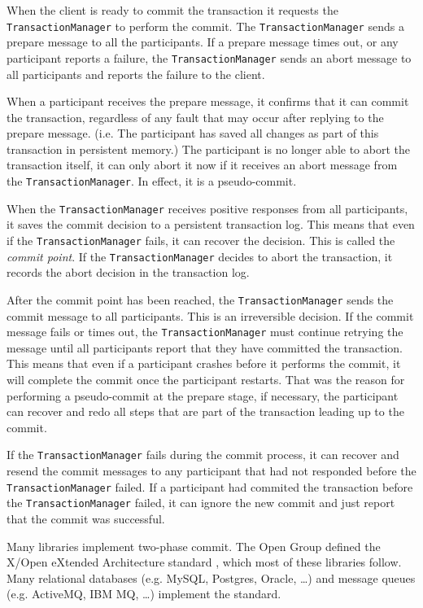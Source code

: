 When the client is ready to commit the transaction it requests the \texttt{TransactionManager} to perform the commit.
The \texttt{TransactionManager} sends a prepare message to all the participants.
If a prepare message times out, or any participant reports a failure,
the \texttt{TransactionManager} sends an abort message to all participants and reports the failure to the client.

When a participant receives the prepare message, it confirms that it can commit the transaction,
regardless of any fault that may occur after replying to the prepare message.
(i.e. The participant has saved all changes as part of this transaction in persistent memory.)
The participant is no longer able to abort the transaction itself,
it can only abort it now if it receives an abort message from the \texttt{TransactionManager}.
In effect, it is a pseudo-commit.

When the \texttt{TransactionManager} receives positive responses from all participants,
it saves the commit decision to a persistent transaction log.
This means that even if the \texttt{TransactionManager} fails, it can recover the decision.
This is called the \emph{commit point}.
If the \texttt{TransactionManager} decides to abort the transaction,
it records the abort decision in the transaction log.

After the commit point has been reached, the \texttt{TransactionManager} sends the commit message to all participants.
This is an irreversible decision.
If the commit message fails or times out, the \texttt{TransactionManager} must continue retrying the message
until all participants report that they have committed the transaction.
This means that even if a participant crashes before it performs the commit, it will complete the commit once the participant restarts.
That was the reason for performing a pseudo-commit at the prepare stage,
if necessary, the participant can recover and redo all steps that are part of the transaction leading up to the commit.

If the \texttt{TransactionManager} fails during the commit process,
it can recover and resend the commit messages to any participant that had not responded before the \texttt{TransactionManager} failed.
If a participant had commited the transaction before the \texttt{TransactionManager} failed,
it can ignore the new commit and just report that the commit was successful.

Many libraries implement two-phase commit.
The Open Group defined the X/Open eXtended Architecture standard \cite{xa-std}, which most of these libraries follow.
Many relational databases (e.g. MySQL, Postgres, Oracle, \dots) and message queues (e.g. ActiveMQ, IBM MQ, \dots)
implement the standard.

